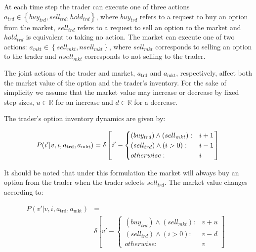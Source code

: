 At each time step the trader can execute one of three actions
$a_{trd} \in \left\{buy_{trd}, sell_{trd}, hold_{trd}\right\}$, where $buy_{trd}$ refers to a request to 
buy an option from the market, $sell_{trd}$ refers to a request to sell an option to
the market and $hold_{trd}$ is equivalent to taking no action. 
The market can execute one of two actions: $a_{mkt} \in \left\{sell_{mkt}, nsell_{mkt} \right\}$,
where $sell_{mkt}$ corresponds to selling an option to the trader and $nsell_{mkt}$ 
corresponds to not selling to the trader. 

The joint actions of the trader and market, $a_{\text{trd}}$ and 
$a_{\text{mkt}}$, respectively, affect both the market value of the option
and the trader's inventory. For the sake of simplicity we assume that
the market value may increase or decrease by fixed step sizes, 
$u \in \mathbb{R}$ for an increase and $d \in \mathbb{R}$ for a decrease.

The trader's option inventory dynamics are given by:

{\small 
\begin{equation*}
P(i' | v, i, a_{\text{trd}}, a_{\text{mkt}}) = \delta \left[ i' - \begin{cases}
      (buy_{trd}) \wedge (sell_{mkt}) : & i + 1 \\ 
      (sell_{trd}) \wedge (i > 0) : & i - 1 \\
      otherwise: & i \\
    \end{cases} \right] \\
\end{equation*}
}%

It should be noted that under this formulation the market will always
buy an option from the trader when the trader selects $sell_{trd}$. 
The market value changes according to:

{\small 
\begin{align*}
P(v' | v, i, a_{\text{trd}}, a_{\text{mkt}}) &= \\
&
\delta \left[ v' - \begin{cases}
      (buy_{trd}) \wedge (sell_{mkt})  : & v + u \\
       (sell_{trd}) \wedge (i > 0) : & v - d \\
      otherwise: & v
    \end{cases} \right] & \\    
\end{align*}
}%


